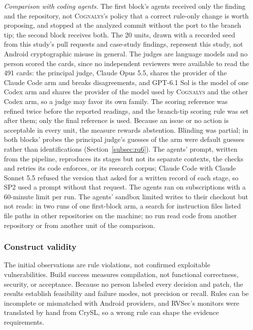 \documentclass[conference]{IEEEtran}
\newcommand{\system}{\textsc{Cognalys}}
\begin{document}
\emph{Comparison with coding agents.} The first block's agents received only
the finding and the repository, not \system{}'s policy that a correct
rule-only change is worth proposing, and stopped at the analyzed commit
without the port to the branch tip; the second block receives both. The 20 units, drawn with a
recorded seed from this study's pull requests and case-study findings,
represent this study, not Android cryptographic misuse in general. The
judges are language models and no person scored the cards, since no
independent reviewers were available to read the 491 cards: the principal
judge, Claude Opus 5.5, shares the provider of the Claude Code arm and breaks
disagreements, and GPT-6.1 Sol is the model of one Codex arm and shares the
provider of the model used by \system{} and the other Codex arm, so a judge may
favor its own family. The scoring reference was refined twice before the
reported readings, and the branch-tip scoring rule was set after them; only the
final reference is used. Because an issue or no action is acceptable in every
unit, the measure rewards abstention. Blinding was partial; in both blocks' probes the
principal judge's guesses of the arm were default guesses rather than
identifications (Section~\ref{subsec:rq6}). The agents' prompt, written from the pipeline, reproduces its
stages but not its separate contexts, the checks and retries its code
enforces, or its research corpus; Claude Code with Claude Sonnet 5.5 refused
the version that asked for a written record of each stage, so SP2 used a
prompt without that request. The agents ran on subscriptions with a 60-minute
limit per run. The agents' sandbox limited writes to their checkout but not
reads: in two runs of one first-block arm, a search for instruction files
listed file paths in other repositories on the machine; no run read code from
another repository or from another unit of the comparison.

\subsubsection{Construct validity}

The initial observations are rule violations, not confirmed exploitable
vulnerabilities. Build success measures compilation, not functional
correctness, security, or acceptance. Because no person labeled every decision
and patch, the results establish feasibility and failure modes, not precision
or recall. Rules can be incomplete or mismatched with Android providers, and
RVSec's monitors were translated by hand from CrySL, so a wrong rule can shape
the evidence requirements.
\end{document}
